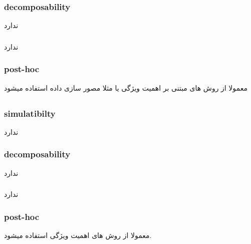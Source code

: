 \documentclass{article}[12pt]
\begin{document}
\subsubsection{decomposability}
ندارد
\subsubsection{}
ندارد
\subsubsection{post-hoc}
معمولا از روش های مبتنی بر اهمیت ویژگی یا مثلا مصور سازی داده استفاده میشود

\subsection{}
\subsubsection{simulatibilty}
ندارد
\subsubsection{decomposability}
ندارد
\subsubsection{}
ندارد
\subsubsection{post-hoc}
معمولا از روش های اهمیت ویژگی استفاده میشود. 
\end{document}
